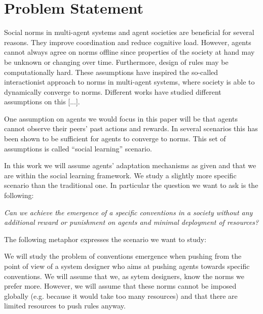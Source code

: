 \section{Problem Statement}


Social norms in multi-agent systems and agent societies are beneficial for several reasons.
They improve coordination and reduce cognitive load. %
However, agents cannot always agree on norms offline since properties of the society at hand may  be unknown or changing over time.
Furthermore, design of rules may be computationally hard.
These assumptions have inspired the so-called interactionist approach to norms in multi-agent systems, %
where society is able to dynamically converge to norms.
Different works have studied different assumptions on this [...]. %

One assumption on agents we would focus in this paper will be that agents cannot observe their peers' past actions
and rewards. %
In several scenarios this has been shown to be sufficient for agents to converge to norms. %
This set of assumptions is called ``social learning'' scenario. %


In this work we will assume agents' adaptation mechanisms as given and
that we are
within the social learning framework.
We study a slightly more specific scenario  than the traditional one.
In particular the question we want to ask is the following:

\begin{center}
\emph{
Can we achieve the  emergence of a specific conventions in a society without any
additional reward or punishment on agents and minimal deployment of resources?
}
\end{center}

The following metaphor expresses the scenario we want to study:



We will study the problem of conventions emergence when pushing 
from the point of view of a system designer who aims at pushing
agents towards specific conventions. We will assume that we, as sytem
designers, know the norms we prefer more.
However, we will assume that  these norms cannot
be imposed globally (e.g. because it would take too many resources)
and that there are limited resources to push rules anyway.

